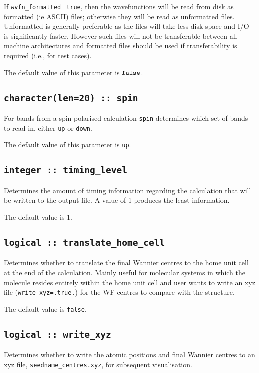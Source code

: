 If \verb#wvfn_formatted#=\verb#true#, then the wavefunctions will be
read from disk as formatted (ie ASCII) files; otherwise they will be
read as unformatted files. Unformatted is generally preferable as the
files will take less disk space and I/O is significantly
faster. However such files will not be transferable between all
machine architectures and formatted files should be used if
transferability is required (i.e., for test cases).

The default value of this parameter is $\verb#false#$.


\subsection[spin]{\tt character(len=20) :: spin}
For bands from a spin polarised calculation {\tt spin} determines which set
of bands to read in, either \verb#up# or \verb#down#.

The default value of this parameter is \verb#up#.


\subsection[timing\_level]{\tt integer :: timing\_level}

Determines the amount of timing information regarding the calculation
that will be written to the output file. A value of 1 produces the
least information.

The default value is 1.

\subsection[translate\_home\_cell]{\tt logical :: translate\_home\_cell}

Determines whether to translate the final Wannier centres to the home
unit cell at the end of the calculation. Mainly useful for molecular
systems in which the molecule resides entirely within the home unit
cell and user wants to write an xyz file ({\tt write\_xyz=.true.}) for
the WF centres to compare with the structure.

The default value is \verb#false#.

\subsection[write\_xyz]{\tt logical :: write\_xyz}

Determines whether to write the atomic positions and
final Wannier centres to an xyz file,
\verb#seedname_centres.xyz#, for subsequent
visualisation.


